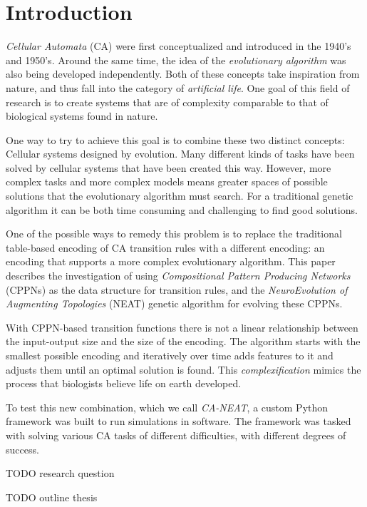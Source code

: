 \chapter{Introduction}
\textit{Cellular Automata} (CA) were first conceptualized and introduced in the 1940's and 1950's.
Around the same time, the idea of the \textit{evolutionary algorithm} was also being developed independently.
Both of these concepts take inspiration from nature, and thus fall into the category of \textit{artificial life}.
One goal of this field of research is to create systems that are of complexity comparable to that of biological systems found in nature.

One way to try to achieve this goal is to combine these two distinct concepts: Cellular systems designed by evolution.
Many different kinds of tasks have been solved by cellular systems that have been created this way.
However, more complex tasks and more complex models means greater spaces of possible solutions that the evolutionary algorithm must search.
For a traditional genetic algorithm it can be both time consuming and challenging to find good solutions.

One of the possible ways to remedy this problem is to replace the traditional table-based encoding of CA transition rules with a different encoding: an encoding that supports a more complex evolutionary algorithm.
This paper describes the investigation of using \textit{Compositional Pattern Producing Networks} (CPPNs) as the data structure for transition rules,
and the \textit{NeuroEvolution of Augmenting Topologies} (NEAT) genetic algorithm for evolving these CPPNs.

With CPPN-based transition functions there is not a linear relationship between the input-output size and the size of the encoding.
The algorithm starts with the smallest possible encoding and iteratively over time adds features to it and adjusts them until an optimal solution is found.
This \textit{complexification} mimics the process that biologists believe life on earth developed.

To test this new combination, which we call \textit{CA-NEAT},
a custom Python framework was built to run simulations in software.
The framework was tasked with solving various CA tasks of different difficulties, with different degrees of success.

TODO research question

TODO outline thesis
